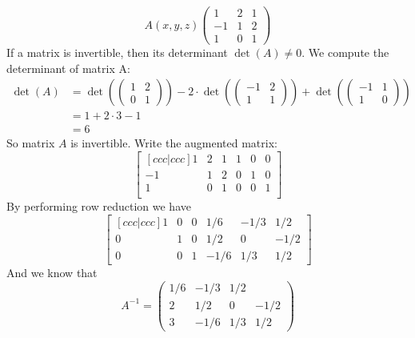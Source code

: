 \begin{homeworkProblem}
\solution
\[
A(x, y, z)
\begin{pmatrix}
    1 & 2 &  1\\
    -1 & 1 & 2\\
    1 & 0 & 1
\end{pmatrix}
\]
If a matrix is invertible, then its determinant $\det(A) \neq 0$. We compute the determinant of matrix A:
\[
\begin{aligned}
\det(A) &= \det(\begin{pmatrix}
    1 & 2\\
    0 & 1
\end{pmatrix}) - 2 \cdot \det(\begin{pmatrix}
    -1 & 2\\
     1 & 1
\end{pmatrix}) + \det(\begin{pmatrix}
    -1 & 1\\
    1 & 0
\end{pmatrix})\\
&= 1 +2\cdot3 -1 \\ &= 6
\end{aligned}
\]
So matrix $A$ is invertible.
Write the augmented matrix: \[
    \begin{bmatrix}[ccc|ccc]
        1&2&1&1&0&0\\
        -1&1&2&0&1&0\\
        1&0&1&0&0&1\\
    \end{bmatrix}
\]
By performing row reduction we have
\[
\begin{bmatrix}[ccc|ccc]
    1&0&0&1/6&-1/3&1/2\\
    0&1&0&1/2&0&-1/2\\
    0&0&1&-1/6&1/3&1/2
\end{bmatrix}
\]
And we know that \[
A^{-1} = \begin{pmatrix}
    1/6&-1/3&1/2\\
    2&1/2&0&-1/2\\
    3&-1/6&1/3&1/2
\end{pmatrix}
\]

\end{homeworkProblem}
